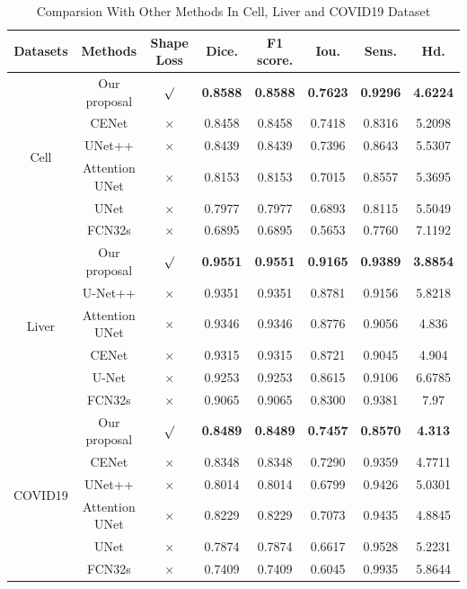 \documentclass[UTF8]{article} %
\begin{document}
\begin{table}[htbp]
\begin{center}
\begin{tabular}{cccccccc}
    \toprule
    Datasets & Methods & Shape Loss & Dice. & F1 score. & Iou. & Sens. & Hd.\\
    \midrule
    \multirow{6}{*}{Cell} & Our proposal & $\surd$ & \textbf{0.8588} & \textbf{0.8588} & \textbf{0.7623} & \textbf{0.9296} & \textbf{4.6224}\\
                          & CENet & $\times$ & 0.8458 & 0.8458 & 0.7418 & 0.8316 & 5.2098\\
                          & UNet++ & $\times$ & 0.8439 & 0.8439 & 0.7396 & 0.8643 & 5.5307\\
                          & Attention UNet & $\times$ & 0.8153 & 0.8153 & 0.7015 & 0.8557 & 5.3695\\
                          & UNet  & $\times$  & 0.7977 & 0.7977 & 0.6893 & 0.8115 & 5.5049\\
                          & FCN32s & $\times$ & 0.6895 & 0.6895 & 0.5653 & 0.7760 & 7.1192\\
                          \hline
    \multirow{6}{*}{Liver}   & Our proposal & $\surd$ & \textbf{0.9551} & \textbf{0.9551} & \textbf{0.9165} & \textbf{0.9389} & \textbf{3.8854}\\
                          & U-Net++ & $\times$ & 0.9351 & 0.9351 & 0.8781 & 0.9156 & 5.8218\\
                          & Attention UNet & $\times$ & 0.9346 & 0.9346 & 0.8776 & 0.9056 & 4.836\\
                          & CENet & $\times$ & 0.9315 & 0.9315 & 0.8721 & 0.9045 & 4.904\\
                          & U-Net & $\times$ & 0.9253 & 0.9253 & 0.8615 & 0.9106 & 6.6785\\
                          & FCN32s & $\times$ & 0.9065 & 0.9065 & 0.8300 & 0.9381 & 7.97\\
                          \hline
    \multirow{6}{*}{COVID19} &  Our proposal & $\surd$ & \textbf{0.8489} & \textbf{0.8489} & \textbf{0.7457} & \textbf{0.8570} & \textbf{4.313}\\
                          &  CENet & $\times$ & 0.8348 & 0.8348 & 0.7290 & 0.9359 & 4.7711\\
                          &  UNet++ & $\times$ & 0.8014 & 0.8014 & 0.6799 & 0.9426 & 5.0301\\
                          &  Attention UNet & $\times$ & 0.8229 & 0.8229 & 0.7073 & 0.9435 & 4.8845\\
                          &  UNet  & $\times$ & 0.7874 & 0.7874 & 0.6617 & 0.9528 & 5.2231\\
                          &  FCN32s & $\times$ & 0.7409 & 0.7409 & 0.6045 & 0.9935 & 5.8644\\
  \bottomrule    
    \end{tabular}
    \caption{Comparsion With Other Methods In Cell\cite{dsb2018}, Liver\cite{liver} and COVID19\cite{covid19_2} Dataset}
  \end{center}
    \vspace{-4mm}
  \end{table}
\end{document}
